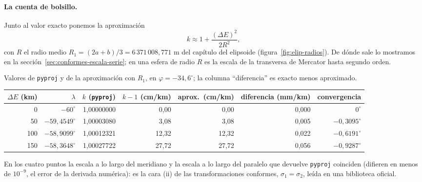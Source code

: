 \paragraph{La cuenta de bolsillo.} Junto al valor exacto ponemos la aproximación
\[
  k\approx1+\frac{(\Delta E)^2}{2R^2},
\]
con \(R\) el radio medio \(R_1=(2a+b)/3=6\,371\,008{,}771\) m del capítulo del elipsoide
(figura~\ref{fig:elip-radios}). De dónde sale lo mostramos en la
sección~\ref{sec:conformes-escala-serie}; en una esfera de radio \(R\) es la escala de la
transversa de Mercator hasta segundo orden.

\begin{ejemplo}\label{ej:conf-faja5}
Valores de \texttt{pyproj} y de la aproximación con \(R_1\), en \(\varphi=-34{,}6^\circ\); la
columna \enquote{diferencia} es exacto menos aproximado.

{\small
\begin{center}
\begin{tabular}{r r r r r r r}
\toprule
\(\Delta E\) (km) & \(\lambda\) & \(k\) (\texttt{pyproj}) & \(k-1\) (cm/km) & aprox.\ (cm/km) & diferencia (mm/km) & convergencia\\
\midrule
0 & \(-60^\circ\) & 1{,}00000000 & 0{,}00 & 0{,}00 & 0{,}000 & \(0^\circ\)\\
50 & \(-59{,}4549^\circ\) & 1{,}00003080 & 3{,}08 & 3{,}08 & 0{,}005 & \(-0{,}3095^\circ\)\\
100 & \(-58{,}9099^\circ\) & 1{,}00012321 & 12{,}32 & 12{,}32 & 0{,}022 & \(-0{,}6191^\circ\)\\
150 & \(-58{,}3648^\circ\) & 1{,}00027722 & 27{,}72 & 27{,}72 & 0{,}056 & \(-0{,}9287^\circ\)\\
\bottomrule
\end{tabular}
\end{center}
}

En los cuatro puntos la escala a lo largo del meridiano y la escala a lo largo del paralelo
que devuelve \texttt{pyproj} coinciden (difieren en menos de \(10^{-9}\), el error de la
derivada numérica): es la cara (ii) de las transformaciones conformes, \(\sigma_1=\sigma_2\),
leída en una biblioteca oficial.
\end{ejemplo}

